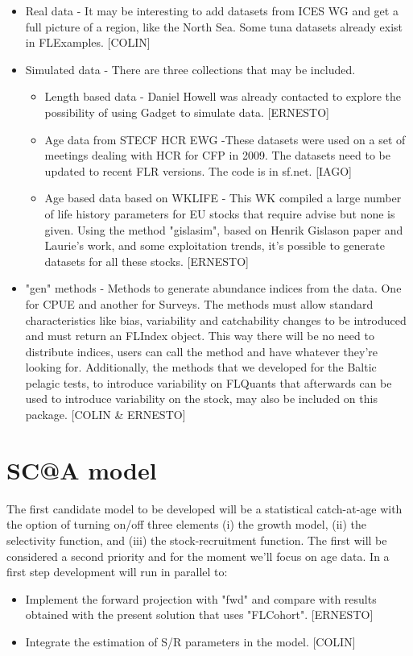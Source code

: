 \documentclass[10pt,a4paper]{article}
\begin{document}
\begin{itemize}
	\item Real data - It may be interesting to add datasets from ICES WG and get a full picture of a region, like the North Sea. Some tuna datasets already exist in FLExamples. [COLIN]  
	\item Simulated data - There are three collections that may be included.
	\begin{itemize}
		\item Length based data - Daniel Howell was already contacted to explore the possibility of using Gadget to simulate data. [ERNESTO]
		\item Age data from STECF HCR EWG -These datasets were used on a set of meetings dealing with HCR for CFP in 2009. The datasets need to be updated to recent FLR versions. The code is in sf.net. [IAGO]
		\item Age based data based on WKLIFE - This WK compiled a large number of life history parameters for EU stocks that require advise but none is given. Using the method "gislasim", based on Henrik Gislason paper and Laurie's work, and some exploitation trends, it's possible to generate datasets for all these stocks. [ERNESTO]   
	\end{itemize}
	\item "gen" methods - Methods to generate abundance indices from the data. One for CPUE and another for Surveys. The methods must allow standard characteristics like bias, variability and catchability changes to be introduced and must return an FLIndex object. This way there will be no need to distribute indices, users can call the method and have whatever they're looking for. Additionally, the methods that we developed for the Baltic pelagic tests, to introduce variability on FLQuants that afterwards can be used to introduce variability on the stock, may also be included on this package. [COLIN \& ERNESTO]
\end{itemize}

\section{SC@A model}
The first candidate model to be developed will be a statistical catch-at-age with the option of turning on/off three elements (i) the growth model, (ii) the selectivity function, and (iii) the stock-recruitment function. The first will be considered a second priority and for the moment we'll focus on age data.
In a first step development will run in parallel to:
\begin{itemize}
	\item Implement the forward projection with "fwd" and compare with results obtained with the present solution that uses "FLCohort". [ERNESTO]
	\item Integrate the estimation of S/R parameters in the model. [COLIN]
\end{itemize}
\end{document}
